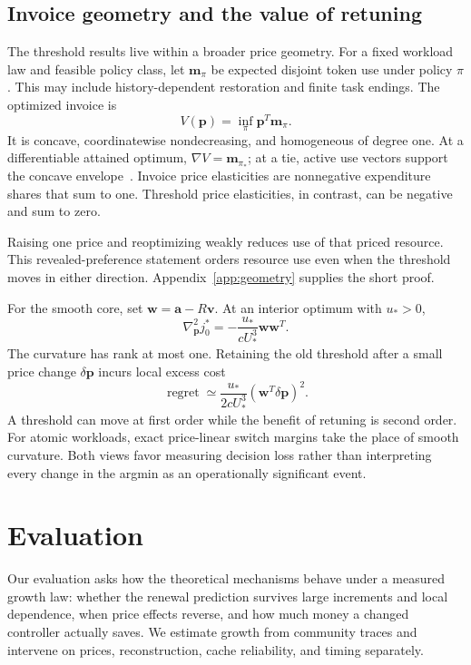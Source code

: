 \documentclass[sigconf,screen,nonacm]{acmart}
\newcommand{\pp}{\boldsymbol{p}}
\newcommand{\avec}{\boldsymbol{a}}
\newcommand{\Vvec}{\boldsymbol{v}}
\newcommand{\Mvec}{\boldsymbol{m}}
\newcommand{\Wvec}{\boldsymbol{w}}
\begin{document}
\subsection{Invoice geometry and the value of retuning}
\label{sec:geometry}

The threshold results live within a broader price geometry. For a fixed
workload law and feasible policy class, let $\Mvec_\pi$ be expected disjoint
token use under policy $\pi$. This may include history-dependent restoration
and finite task endings. The optimized invoice is
\begin{equation}
V(\pp)=\inf_\pi\pp^T\Mvec_\pi.
\label{eq:envelope}
\end{equation}
It is concave, coordinatewise nondecreasing, and homogeneous of degree one.
At a differentiable attained optimum, $\nabla V=\Mvec_{\pi_*}$; at a tie,
active use vectors support the concave envelope~\cite{milgrom}. Invoice price
elasticities are nonnegative expenditure shares that sum to one. Threshold
price elasticities, in contrast, can be negative and sum to zero.

Raising one price and reoptimizing weakly reduces use of that priced resource.
This revealed-preference statement orders resource use even when the threshold
moves in either direction. Appendix~\ref{app:geometry} supplies the short proof.

For the smooth core, set $\Wvec=\avec-R\Vvec$. At an interior optimum with $u_*>0$,
\begin{equation}
\nabla^2_{\pp}j_0^*
=-\frac{u_*}{cU_*^3}\Wvec\Wvec^T.
\label{eq:hessian}
\end{equation}
The curvature has rank at most one. Retaining the old threshold after a small
price change $\delta\pp$ incurs local excess cost
\begin{equation}
\operatorname{regret}\simeq
\frac{u_*}{2cU_*^3}(\Wvec^T\delta\pp)^2.
\label{eq:regret}
\end{equation}
A threshold can move at first order while the benefit of retuning is second
order. For atomic workloads, exact price-linear switch margins take the place
of smooth curvature. Both views favor measuring decision loss rather than
interpreting every change in the argmin as an operationally significant event.

\section{Evaluation}
\label{sec:evaluation}

Our evaluation asks how the theoretical mechanisms behave under a measured
growth law: whether the renewal prediction survives large increments and local
dependence, when price effects reverse, and how much money a changed controller
actually saves. We estimate growth from community traces and intervene on
prices, reconstruction, cache reliability, and timing separately.
\end{document}
